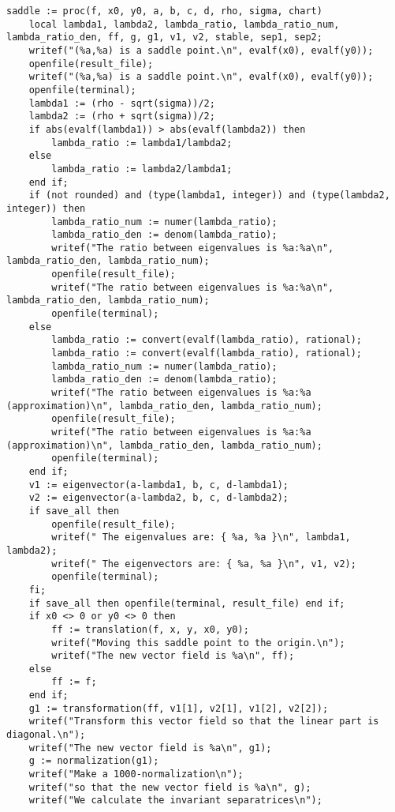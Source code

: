\documentclass[a4paper,10pt]{article}
\begin{document}
\begin{lstlisting}[name=type]
saddle := proc(f, x0, y0, a, b, c, d, rho, sigma, chart)
    local lambda1, lambda2, lambda_ratio, lambda_ratio_num, lambda_ratio_den, ff, g, g1, v1, v2, stable, sep1, sep2;
    writef("(%a,%a) is a saddle point.\n", evalf(x0), evalf(y0));
    openfile(result_file);
    writef("(%a,%a) is a saddle point.\n", evalf(x0), evalf(y0));
    openfile(terminal);
    lambda1 := (rho - sqrt(sigma))/2;
    lambda2 := (rho + sqrt(sigma))/2;
    if abs(evalf(lambda1)) > abs(evalf(lambda2)) then
        lambda_ratio := lambda1/lambda2;
    else
        lambda_ratio := lambda2/lambda1;
    end if;
    if (not rounded) and (type(lambda1, integer)) and (type(lambda2, integer)) then 
        lambda_ratio_num := numer(lambda_ratio);
        lambda_ratio_den := denom(lambda_ratio);
        writef("The ratio between eigenvalues is %a:%a\n", lambda_ratio_den, lambda_ratio_num);
        openfile(result_file);
        writef("The ratio between eigenvalues is %a:%a\n", lambda_ratio_den, lambda_ratio_num);
        openfile(terminal);
    else
        lambda_ratio := convert(evalf(lambda_ratio), rational);
        lambda_ratio := convert(evalf(lambda_ratio), rational);        
        lambda_ratio_num := numer(lambda_ratio);
        lambda_ratio_den := denom(lambda_ratio);
        writef("The ratio between eigenvalues is %a:%a (approximation)\n", lambda_ratio_den, lambda_ratio_num);
        openfile(result_file);
        writef("The ratio between eigenvalues is %a:%a (approximation)\n", lambda_ratio_den, lambda_ratio_num);
        openfile(terminal);
    end if;
    v1 := eigenvector(a-lambda1, b, c, d-lambda1);
    v2 := eigenvector(a-lambda2, b, c, d-lambda2);
    if save_all then
        openfile(result_file);
        writef(" The eigenvalues are: { %a, %a }\n", lambda1, lambda2);
        writef(" The eigenvectors are: { %a, %a }\n", v1, v2);
        openfile(terminal);
    fi;
    if save_all then openfile(terminal, result_file) end if;
    if x0 <> 0 or y0 <> 0 then
        ff := translation(f, x, y, x0, y0);
        writef("Moving this saddle point to the origin.\n");
        writef("The new vector field is %a\n", ff);
    else
        ff := f;
    end if;
    g1 := transformation(ff, v1[1], v2[1], v1[2], v2[2]);
    writef("Transform this vector field so that the linear part is diagonal.\n");
    writef("The new vector field is %a\n", g1);
    g := normalization(g1);
    writef("Make a 1000-normalization\n");
    writef("so that the new vector field is %a\n", g);
    writef("We calculate the invariant separatrices\n");

\end{lstlisting}
\end{document}
